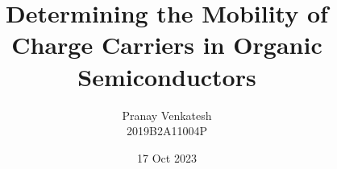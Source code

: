 \documentclass[11pt, a4paper, oneside]{article} %
\title{Determining the Mobility of Charge Carriers in Organic Semiconductors}
\author{Pranay Venkatesh \\ 2019B2A11004P}
\date{17 Oct 2023}
\begin{document}



\begin{titlepage}
\maketitle
\end{titlepage}







%
%
%
%




\label{Bibliography}


\printbibliography
\end{document}
